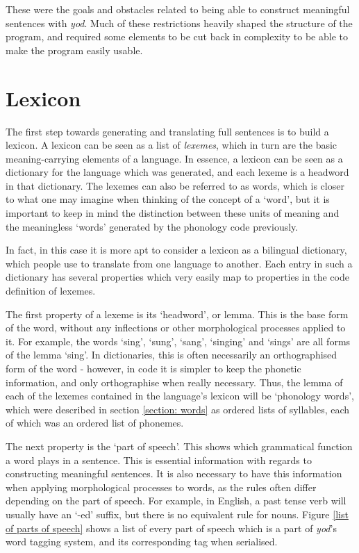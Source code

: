 \documentclass{report}
\begin{document}
	These were the goals and obstacles related to being able to construct meaningful sentences with \textit{yod}. Much of these restrictions heavily shaped the structure of the program, and required some elements to be cut back in complexity to be able to make the program easily usable.
	
	\section{Lexicon}
	
	The first step towards generating and translating full sentences is to build a lexicon. A lexicon can be seen as a list of \textit{lexemes}, which in turn are the basic meaning-carrying elements of a language. In essence, a lexicon can be seen as a dictionary for the language which was generated, and each lexeme is a headword in that dictionary. The lexemes can also be referred to as words, which is closer to what one may imagine when thinking of the concept of a `word', but it is important to keep in mind the distinction between these units of meaning and the meaningless `words' generated by the phonology code previously. 
	
	In fact, in this case it is more apt to consider a lexicon as a bilingual dictionary, which people use to translate from one language to another. Each entry in such a dictionary has several properties which very easily map to properties in the code definition of lexemes.
	
	The first property of a lexeme is its `headword', or lemma. This is the base form of the word, without any inflections or other morphological processes applied to it. For example, the words `sing', `sung', `sang', `singing' and `sings' are all forms of the lemma `sing'. In dictionaries, this is often necessarily an orthographised form of the word - however, in code it is simpler to keep the phonetic information, and only orthographise when really necessary. Thus, the lemma of each of the lexemes contained in the language's lexicon will be `phonology words', which were described in section \ref{section: words} as ordered lists of syllables, each of which was an ordered list of phonemes.
	
	The next property is the `part of speech'. This shows which grammatical function a word plays in a sentence. This is essential information with regards to constructing meaningful sentences. It is also necessary to have this information when applying morphological processes to words, as the rules often differ depending on the part of speech. For example, in English, a past tense verb will usually have an `-ed' suffix, but there is no equivalent rule for nouns. Figure \ref{list of parts of speech} shows a list of every part of speech which is a part of \textit{yod}'s word tagging system, and its corresponding tag when serialised.
	
\end{document}
